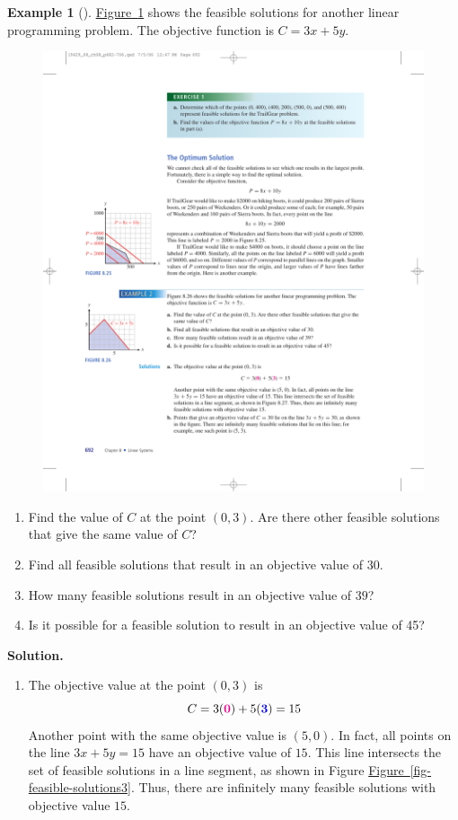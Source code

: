\documentclass[10pt,]{book}
\theoremstyle{plain}
\theoremstyle{definition}
\theoremstyle{definition}
\newtheorem{example}[theorem]{Example}
\theoremstyle{definition}
\numberwithin{equation}{part}
\newcommand{\alert}[1]{\boldsymbol{\color{magenta}{#1}}}
\newcommand{\blert}[1]{\boldsymbol{\color{blue}{#1}}}
\begin{document}
\begin{example}[]\label{example-2}
\hyperref[fig-feasible-solutions2]{Figure~\ref{fig-feasible-solutions2}} shows the feasible solutions for another linear programming problem. The objective function is \(C = 3x + 5y\). \leavevmode%
\begin{figure}
\centering
\includegraphics[width=0.5\linewidth]{images/fig-feasible-solutions2}
\caption{\label{fig-feasible-solutions2}}
\end{figure}
 \leavevmode%
\begin{enumerate}[label=\alph*]
\item\hypertarget{li-9}{}Find the value of \(C\) at the point \((0, 3)\). Are there other feasible solutions that give the same value of \(C\)?%
\item\hypertarget{li-10}{}Find all feasible solutions that result in an objective value of \(30\).%
\item\hypertarget{li-11}{}How many feasible solutions result in an objective value of \(39\)?%
\item\hypertarget{li-12}{}Is it possible for a feasible solution to result in an objective value of 45?%
\end{enumerate}
%
\par\medskip\noindent%
\textbf{Solution.}\quad \leavevmode%
\begin{enumerate}[label=\alph*]
\item\hypertarget{li-13}{}The objective value at the point \((0, 3)\) is%
\begin{equation*}
C = 3(\alert{0}) + 5(\blert{3}) = 15
\end{equation*}
Another point with the same objective value is \((5, 0)\). In fact, all points on the line \(3x + 5y = 15\) have an objective value of \(15\). This line intersects the set of feasible solutions in a line segment, as shown in Figure \hyperref[fig-feasible-solutions3]{Figure~\ref{fig-feasible-solutions3}}. Thus, there are infinitely many feasible solutions with objective value \(15\). \leavevmode%

\end{enumerate}
\end{example}
\end{document}
